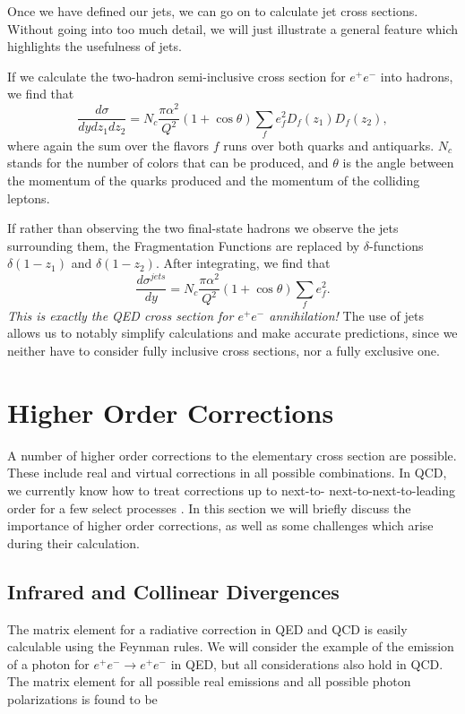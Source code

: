 \documentclass[10pt,a4paper]{book}
\begin{document}
Once we have defined our jets, we can go on to calculate jet cross sections. Without going into too much detail, we will just illustrate a general feature which highlights the usefulness of jets. 

If we calculate the two-hadron semi-inclusive cross section for $e^+e^-$ into hadrons, we find that
\begin{equation}
\frac{d\sigma}{dydz_1dz_2} = N_c \frac{\pi \alpha^2}{Q^2} \left(1 + \cos\theta \right) \sum_f e_f^2 D_f(z_1) D_f(z_2),
\end{equation}
where again the sum over the flavors $f$ runs over both quarks and antiquarks. $N_c$ stands for the number of colors that can be produced, and $\theta$ is the angle between the momentum of the quarks produced and the momentum of the colliding leptons.

If rather than observing the two final-state hadrons we observe the jets surrounding them, the Fragmentation Functions are replaced by $\delta$-functions $\delta(1 - z_1)$ and $\delta(1 - z_2)$. After integrating, we find that
\begin{equation}
\frac{d\sigma^{jets}}{dy} = N_c \frac{\pi \alpha^2}{Q^2} \left(1 + \cos\theta \right) \sum_f e_f^2.
\end{equation}
\emph{This is exactly the QED cross section for $e^+e^-$ annihilation!} The use of jets allows us to notably simplify calculations and make accurate predictions, since we neither have to consider fully inclusive cross sections, nor a fully exclusive one.
 
\section{Higher Order Corrections}

A number of higher order corrections to the elementary cross section are possible. These include real and virtual corrections in all possible combinations. In QCD, we currently know how to treat corrections up to next-to-
next-to-next-to-leading order for a few select processes \cite{DUHR20162128, Anastasiou:2015vya}. In this section we will briefly discuss the importance of higher order corrections, as well as some challenges which arise during their calculation.

\subsection{Infrared and Collinear Divergences}
The matrix element for a radiative correction in QED and QCD is easily calculable using the Feynman rules. We will consider the example of the emission of a photon for $e^+e^- \rightarrow e^+e^-$ in QED, but all considerations also hold in QCD. The matrix element for all possible real emissions and all possible photon polarizations is found to be
\end{document}
